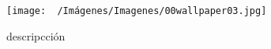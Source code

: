 \begin{figure}[h]
	\texttt{[image: ~/Imágenes/Imagenes/00wallpaper03.jpg]}
	\caption{descripcción}
\end{figure}

